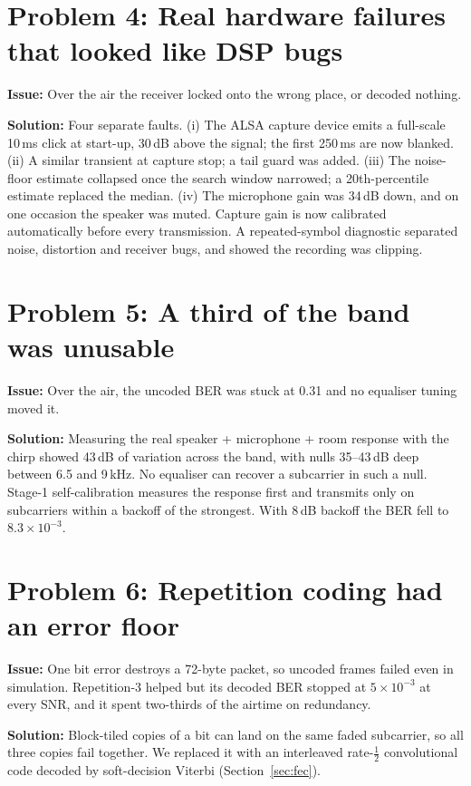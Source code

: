 \documentclass[11pt,a4paper]{report}
\begin{document}
\section{Problem 4: Real hardware failures that looked like DSP bugs}
\label{prob:hw}
\textbf{Issue:} Over the air the receiver locked onto the wrong place, or decoded
nothing.

\textbf{Solution:} Four separate faults. (i) The ALSA capture device emits a
full-scale 10\,ms click at start-up, 30\,dB above the signal; the first 250\,ms are
now blanked. (ii) A similar transient at capture stop; a tail guard was added.
(iii) The noise-floor estimate collapsed once the search window narrowed; a
20th-percentile estimate replaced the median. (iv) The microphone gain was 34\,dB
down, and on one occasion the speaker was muted. Capture gain is now calibrated
automatically before every transmission. A repeated-symbol diagnostic separated
noise, distortion and receiver bugs, and showed the recording was clipping.

\section{Problem 5: A third of the band was unusable}
\textbf{Issue:} Over the air, the uncoded BER was stuck at 0.31 and no equaliser
tuning moved it.

\textbf{Solution:} Measuring the real speaker + microphone + room response with the
chirp showed 43\,dB of variation across the band, with nulls 35--43\,dB deep between
6.5 and 9\,kHz. No equaliser can recover a subcarrier in such a null. Stage-1
self-calibration measures the response first and transmits only on subcarriers
within a backoff of the strongest. With 8\,dB backoff the BER fell to
$8.3\times10^{-3}$.

\section{Problem 6: Repetition coding had an error floor}
\textbf{Issue:} One bit error destroys a 72-byte packet, so uncoded frames failed
even in simulation. Repetition-3 helped but its decoded BER stopped at
$5\times10^{-3}$ at every SNR, and it spent two-thirds of the airtime on redundancy.

\textbf{Solution:} Block-tiled copies of a bit can land on the same faded subcarrier,
so all three copies fail together. We replaced it with an interleaved rate-$\tfrac12$
convolutional code decoded by soft-decision Viterbi (Section~\ref{sec:fec}).
\end{document}

